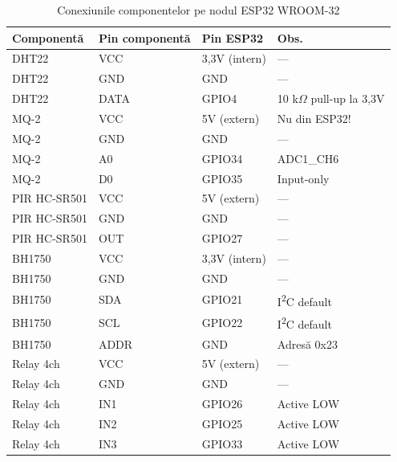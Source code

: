 \documentclass[12pt, twoside, a4paper]{report}
\begin{document}
\begin{table}[H]
\caption{Conexiunile componentelor pe nodul ESP32 WROOM-32}
\label{tab:conexiuni}
\centering
\begin{tabular}{llll}
\toprule
\textbf{Componentă} & \textbf{Pin componentă} & \textbf{Pin ESP32} & \textbf{Obs.} \\
\midrule
DHT22           & VCC       & 3,3V (intern)  & ---                    \\
DHT22           & GND       & GND            & ---                    \\
DHT22           & DATA      & GPIO4          & 10 k$\Omega$ pull-up la 3,3V \\
MQ-2            & VCC       & 5V (extern)    & Nu din ESP32!          \\
MQ-2            & GND       & GND            & ---                    \\
MQ-2            & A0        & GPIO34         & ADC1\_CH6              \\
MQ-2            & D0        & GPIO35         & Input-only             \\
PIR HC-SR501    & VCC       & 5V (extern)    & ---                    \\
PIR HC-SR501    & GND       & GND            & ---                    \\
PIR HC-SR501    & OUT       & GPIO27         & ---                    \\
BH1750          & VCC       & 3,3V (intern)  & ---                    \\
BH1750          & GND       & GND            & ---                    \\
BH1750          & SDA       & GPIO21         & I\textsuperscript{2}C default \\
BH1750          & SCL       & GPIO22         & I\textsuperscript{2}C default \\
BH1750          & ADDR      & GND            & Adresă 0x23            \\
Relay 4ch       & VCC       & 5V (extern)    & ---                    \\
Relay 4ch       & GND       & GND            & ---                    \\
Relay 4ch       & IN1       & GPIO26         & Active LOW             \\
Relay 4ch       & IN2       & GPIO25         & Active LOW             \\
Relay 4ch       & IN3       & GPIO33         & Active LOW             \\

\end{tabular}
\end{table}
\end{document}
